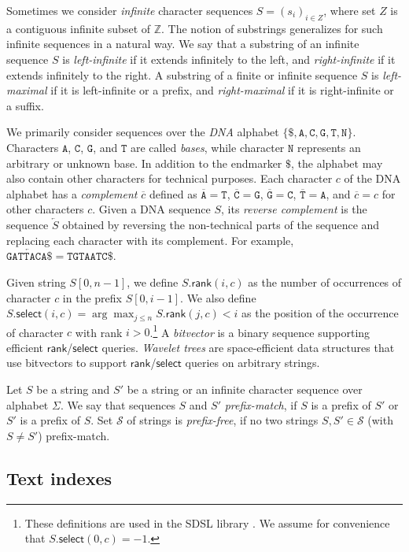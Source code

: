 \documentclass[a4paper,11pt]{llncs}
\newcommand{\set}[1]{\ensuremath{\{ #1 \}}}
\newcommand{\baseA}{\mathtt{A}}
\newcommand{\baseC}{\mathtt{C}}
\newcommand{\baseG}{\mathtt{G}}
\newcommand{\baseT}{\mathtt{T}}
\newcommand{\baseN}{\mathtt{N}}
\newcommand{\dnacomp}[1]{\ensuremath{\overline{#1}}}
\newcommand{\revcomp}[1]{\ensuremath{\overleftarrow{#1}}}
\newcommand{\rank}{\ensuremath{\mathsf{rank}}}
\newcommand{\select}{\ensuremath{\mathsf{select}}}
\begin{document}
Sometimes we consider \emph{infinite} character sequences $S = (s_{i})_{i \in Z}$, where set $Z$ is a contiguous infinite subset of $\mathbb{Z}$. The notion of substrings generalizes for such infinite sequences in a natural way. We say that a substring of an infinite sequence $S$ is \emph{left-infinite} if it extends infinitely to the left, and \emph{right-infinite} if it extends infinitely to the right. A substring of a finite or infinite sequence $S$ is \emph{left-maximal} if it is left-infinite or a prefix, and \emph{right-maximal} if it is right-infinite or a suffix.

We primarily consider sequences over the \emph{DNA} alphabet $\set{\$, \baseA, \baseC, \baseG, \baseT, \baseN}$. Characters $\baseA$, $\baseC$, $\baseG$, and $\baseT$ are called \emph{bases}, while character $\baseN$ represents an arbitrary or unknown base. In addition to the endmarker $\$$, the alphabet may also contain other characters for technical purposes. Each character $c$ of the DNA alphabet has a \emph{complement} $\dnacomp{c}$ defined as $\dnacomp{\baseA} = \baseT$, $\dnacomp{\baseC} = \baseG$, $\dnacomp{\baseG} = \baseC$, $\dnacomp{\baseT} = \baseA$, and $\dnacomp{c} = c$ for other characters $c$. Given a DNA sequence $S$, its \emph{reverse complement} is the sequence $\revcomp{S}$ obtained by reversing the non-technical parts of the sequence and replacing each character with its complement. For example, $\revcomp{\mathtt{GATTACA}\$} = \mathtt{TGTAATC}\$$.

Given string $S[0, n-1]$, we define $S.\rank(i, c)$ as the number of occurrences of character $c$ in the prefix $S[0, i-1]$. We also define $S.\select(i, c) = \arg \max_{j \le n} S.\rank(j, c) < i$ as the position of the occurrence of character $c$ with rank $i > 0$.\footnote{These definitions are used in the SDSL library \cite{Gog2014b}. We assume for convenience that $S.\select(0, c) = -1$.} A \emph{bitvector} is a binary sequence supporting efficient $\rank$/$\select$ queries. \emph{Wavelet trees} \cite{Grossi2003} are space-efficient data structures that use bitvectors to support $\rank$/$\select$ queries on arbitrary strings.

Let $S$ be a string and $S'$ be a string or an infinite character sequence over alphabet $\Sigma$. We say that sequences $S$ and $S'$ \emph{prefix-match}, if $S$ is a prefix of $S'$ or $S'$ is a prefix of $S$. Set $\mathcal{S}$ of strings is \emph{prefix-free}, if no two strings $S, S' \in \mathcal{S}$ (with $S \ne S'$) prefix-match.

\subsection{Text indexes}
\end{document}
